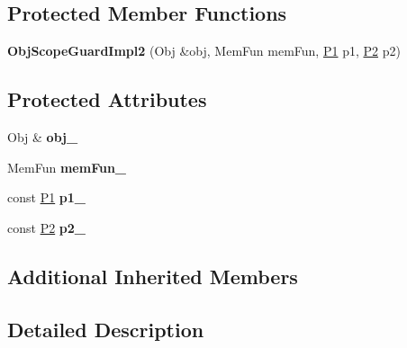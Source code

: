 \subsection*{Protected Member Functions}
\begin{DoxyCompactItemize}
\item 
\hypertarget{classLoki_1_1ObjScopeGuardImpl2_a7851d03c288d32c452fa9c5a6df964bb}{}{\bfseries Obj\+Scope\+Guard\+Impl2} (Obj \&obj, Mem\+Fun mem\+Fun, \hyperlink{structP1}{P1} p1, \hyperlink{structP2}{P2} p2)\label{classLoki_1_1ObjScopeGuardImpl2_a7851d03c288d32c452fa9c5a6df964bb}

\end{DoxyCompactItemize}
\subsection*{Protected Attributes}
\begin{DoxyCompactItemize}
\item 
\hypertarget{classLoki_1_1ObjScopeGuardImpl2_a0e8c8f0e1d0a6f87e5594ce0bd47c318}{}Obj \& {\bfseries obj\+\_\+}\label{classLoki_1_1ObjScopeGuardImpl2_a0e8c8f0e1d0a6f87e5594ce0bd47c318}

\item 
\hypertarget{classLoki_1_1ObjScopeGuardImpl2_afa81ec4dca27baab4464c62f14e9eaa0}{}Mem\+Fun {\bfseries mem\+Fun\+\_\+}\label{classLoki_1_1ObjScopeGuardImpl2_afa81ec4dca27baab4464c62f14e9eaa0}

\item 
\hypertarget{classLoki_1_1ObjScopeGuardImpl2_a592dbd7bd99a8c6904d0fbcf8ea1f239}{}const \hyperlink{structP1}{P1} {\bfseries p1\+\_\+}\label{classLoki_1_1ObjScopeGuardImpl2_a592dbd7bd99a8c6904d0fbcf8ea1f239}

\item 
\hypertarget{classLoki_1_1ObjScopeGuardImpl2_a46c7f12b9225d6c8f81a1ec68304c031}{}const \hyperlink{structP2}{P2} {\bfseries p2\+\_\+}\label{classLoki_1_1ObjScopeGuardImpl2_a46c7f12b9225d6c8f81a1ec68304c031}

\end{DoxyCompactItemize}
\subsection*{Additional Inherited Members}


\subsection{Detailed Description}
